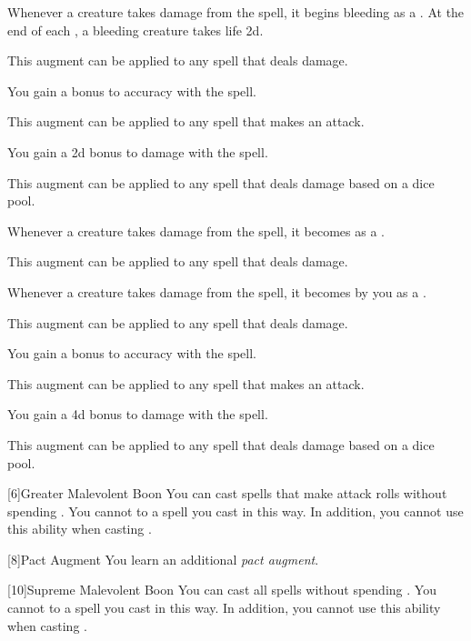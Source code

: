{             Whenever a creature takes damage from the spell, it begins bleeding as a .
            At the end of each , a bleeding creature takes life  \minus2d.
            \par This augment can be applied to any spell that deals damage.

             You gain a  bonus to accuracy with the spell.
            \par This augment can be applied to any spell that makes an attack.

             You gain a \plus2d bonus to damage with the spell.
            \par This augment can be applied to any spell that deals damage based on a dice pool.

             Whenever a creature takes damage from the spell, it becomes  as a .
            \par This augment can be applied to any spell that deals damage.

             Whenever a creature takes damage from the spell, it becomes  by you as a .
            \par This augment can be applied to any spell that deals damage.

             You gain a  bonus to accuracy with the spell.
            \par This augment can be applied to any spell that makes an attack.

             You gain a \plus4d bonus to damage with the spell.
            \par This augment can be applied to any spell that deals damage based on a dice pool.
        }

        [6]{Greater Malevolent Boon} You can cast spells that make attack rolls without spending .
        You cannot  to a spell you cast in this way.
        In addition, you cannot use this ability when casting .

        [8]{Pact Augment} You learn an additional \textit{pact augment}.

        [10]{Supreme Malevolent Boon} You can cast all spells without spending .
        You cannot  to a spell you cast in this way.
        In addition, you cannot use this ability when casting .


